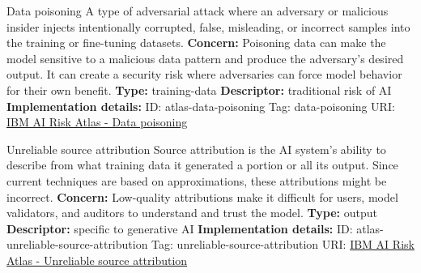 \begin{definitionbox}{Data poisoning}
A type of adversarial attack where an adversary or malicious insider injects intentionally corrupted, false, misleading, or incorrect samples into the training or fine-tuning datasets.\newline\newline
\textbf{Concern: }Poisoning data can make the model sensitive to a malicious data pattern and produce the adversary's desired output. It can create a security risk where adversaries can force model behavior for their own benefit.\newline\newline
\textbf{Type: }training-data\newline
\textbf{Descriptor: }traditional risk of AI \newline\newline
\textbf{Implementation details: } \newline
ID: atlas-data-poisoning \newline
Tag: data-poisoning \newline
URI:  \href{https://www.ibm.com/docs/en/watsonx/saas?topic=SSYOK8/wsj/ai-risk-atlas/data-poisoning.html}{IBM AI Risk Atlas - Data poisoning}\newline
\end{definitionbox}
\begin{definitionbox}{Unreliable source attribution}
Source attribution is the AI system's ability to describe from what training data it generated a portion or all its output. Since current techniques are based on approximations, these attributions might be incorrect.\newline\newline
\textbf{Concern: }Low-quality attributions make it difficult for users, model validators, and auditors to understand and trust the model.\newline\newline
\textbf{Type: }output\newline
\textbf{Descriptor: }specific to generative AI \newline\newline
\textbf{Implementation details: } \newline
ID: atlas-unreliable-source-attribution \newline
Tag: unreliable-source-attribution \newline
URI:  \href{https://www.ibm.com/docs/en/watsonx/saas?topic=SSYOK8/wsj/ai-risk-atlas/unreliable-source-attribution.html}{IBM AI Risk Atlas - Unreliable source attribution}\newline
\end{definitionbox}

